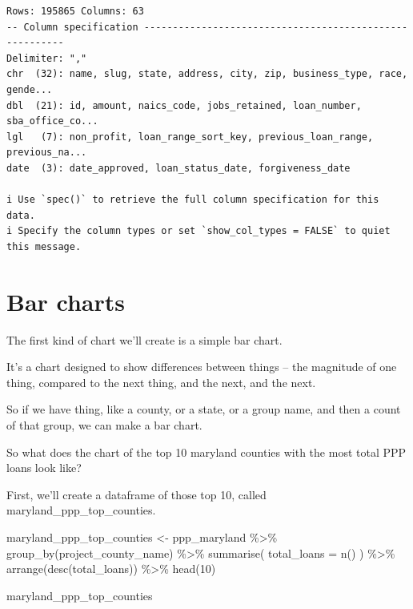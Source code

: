 \documentclass[
  letterpaper,
  DIV=11,
  numbers=noendperiod]{scrreprt}
\newenvironment{Shaded}{\begin{snugshade}}{\end{snugshade}}
\newcommand{\AttributeTok}[1]{\textcolor[rgb]{0.40,0.45,0.13}{#1}}
\newcommand{\DecValTok}[1]{\textcolor[rgb]{0.68,0.00,0.00}{#1}}
\newcommand{\FunctionTok}[1]{\textcolor[rgb]{0.28,0.35,0.67}{#1}}
\newcommand{\NormalTok}[1]{\textcolor[rgb]{0.00,0.23,0.31}{#1}}
\newcommand{\OtherTok}[1]{\textcolor[rgb]{0.00,0.23,0.31}{#1}}
\newcommand{\SpecialCharTok}[1]{\textcolor[rgb]{0.37,0.37,0.37}{#1}}
\begin{document}
\begin{verbatim}
Rows: 195865 Columns: 63
-- Column specification --------------------------------------------------------
Delimiter: ","
chr  (32): name, slug, state, address, city, zip, business_type, race, gende...
dbl  (21): id, amount, naics_code, jobs_retained, loan_number, sba_office_co...
lgl   (7): non_profit, loan_range_sort_key, previous_loan_range, previous_na...
date  (3): date_approved, loan_status_date, forgiveness_date

i Use `spec()` to retrieve the full column specification for this data.
i Specify the column types or set `show_col_types = FALSE` to quiet this message.
\end{verbatim}

\hypertarget{bar-charts}{%
\section{Bar charts}\label{bar-charts}}

The first kind of chart we'll create is a simple bar chart.

It's a chart designed to show differences between things -- the
magnitude of one thing, compared to the next thing, and the next, and
the next.

So if we have thing, like a county, or a state, or a group name, and
then a count of that group, we can make a bar chart.

So what does the chart of the top 10 maryland counties with the most
total PPP loans look like?

First, we'll create a dataframe of those top 10, called
maryland\_ppp\_top\_counties.

\begin{Shaded}
\begin{Highlighting}[]
\NormalTok{maryland\_ppp\_top\_counties }\OtherTok{\textless{}{-}}\NormalTok{ ppp\_maryland }\SpecialCharTok{\%\textgreater{}\%}
  \FunctionTok{group\_by}\NormalTok{(project\_county\_name) }\SpecialCharTok{\%\textgreater{}\%}
  \FunctionTok{summarise}\NormalTok{(}
    \AttributeTok{total\_loans =} \FunctionTok{n}\NormalTok{()}
\NormalTok{  ) }\SpecialCharTok{\%\textgreater{}\%} 
  \FunctionTok{arrange}\NormalTok{(}\FunctionTok{desc}\NormalTok{(total\_loans)) }\SpecialCharTok{\%\textgreater{}\%}
  \FunctionTok{head}\NormalTok{(}\DecValTok{10}\NormalTok{)}

\NormalTok{maryland\_ppp\_top\_counties}
\end{Highlighting}
\end{Shaded}
\end{document}
